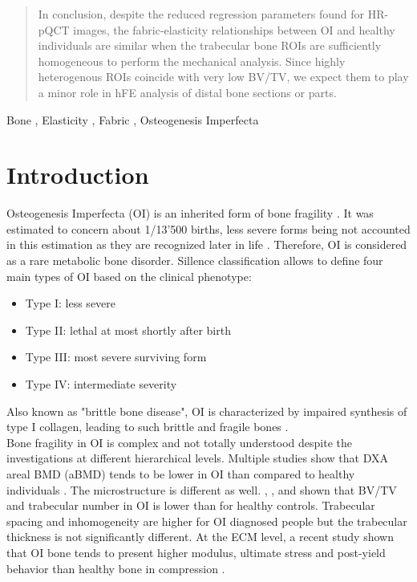 \documentclass[a4paper,fleqn]{DC_ArtStyle}
\begin{document}
\begin{abstract}
In conclusion, despite the reduced regression parameters found for HR-pQCT images, the fabric-elasticity relationships between OI and healthy individuals are similar when the trabecular bone ROIs are sufficiently homogeneous to perform the mechanical analysis. Since highly heterogenous ROIs coincide with very low BV/TV, we expect them to play a minor role in hFE analysis of distal bone sections or parts.

\end{abstract}

\begin{keywords}
Bone \sep
Elasticity \sep
Fabric \sep
Osteogenesis Imperfecta
\end{keywords}


\maketitle

\section{Introduction}

Osteogenesis Imperfecta (OI) is an inherited form of bone fragility \cite{Tournis2018}. It was estimated to concern about 1/13'500 births, less severe forms being not accounted in this estimation as they are recognized later in life \cite{Lindahl2015}. Therefore, OI is considered as a rare metabolic bone disorder. Sillence classification \cite{Sillence1979} allows to define four main types of OI based on the clinical phenotype:
\begin{itemize}
	\item Type I: less severe
	\item Type II: lethal at most shortly after birth
	\item Type III: most severe surviving form
	\item Type IV: intermediate severity
\end{itemize}
Also known as "brittle bone disease", OI is characterized by impaired synthesis of type I collagen, leading to such brittle and fragile bones \cite{LIM2017}.\\

Bone fragility in OI is complex and not totally understood despite the investigations at different hierarchical levels. Multiple studies show that DXA areal BMD (aBMD) tends to be lower in OI than compared to healthy individuals \cite{Folkestad2012,Lindahl2015,Scheres2018}. The microstructure is different as well. \citeauthor{Folkestad2012}\cite{Folkestad2012}, \citeauthor{Kocijan2015}\cite{Kocijan2015}, and \citeauthor{Rolvien2018}\cite{Rolvien2018} shown that BV/TV and trabecular number in OI is lower than for healthy controls. Trabecular spacing and inhomogeneity are higher for OI diagnosed people but the trabecular thickness is not significantly different. At the ECM level, a recent study shown that OI bone tends to present higher modulus, ultimate stress and post-yield behavior than healthy bone in compression \cite{Indermaur2021}.\\
\end{document}
